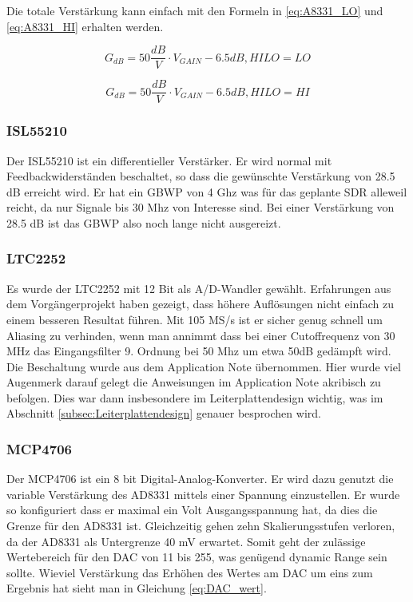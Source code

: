 Die totale Verstärkung kann einfach mit den Formeln\cite{AD8331} in \ref{eq:A8331_LO} und \ref{eq:A8331_HI} erhalten werden.

\begin{equation}
    G_{dB} = 50 \frac{dB}{V} \cdot V_{GAIN} - 6.5 dB, HILO = LO
\label{eq:A8331_LO}
\end{equation}

\begin{equation}
    G_{dB} = 50 \frac{dB}{V} \cdot V_{GAIN} - 6.5 dB, HILO = HI
\label{eq:A8331_HI}
\end{equation}

\subsubsection{ISL55210}
Der ISL55210\cite{ISL55210} ist ein differentieller Verstärker. Er wird normal mit Feedbackwiderständen beschaltet\cite{ImpedanceMatching2009}, so dass die gewünschte Verstärkung von 28.5 dB erreicht wird.
Er hat ein GBWP von 4 Ghz was für das geplante SDR alleweil reicht, da nur Signale bis 30 Mhz von Interesse sind. Bei einer Verstärkung von 28.5 dB ist das GBWP also noch lange nicht ausgereizt.

\subsubsection{LTC2252}
Es wurde der LTC2252\cite{LTC2252} mit 12 Bit als A/D-Wandler gewählt. Erfahrungen aus dem Vorgängerprojekt haben gezeigt, dass höhere Auflösungen nicht einfach zu einem besseren Resultat führen. %
Mit 105 MS/s ist er sicher genug schnell um Aliasing zu verhinden, wenn man annimmt dass bei einer Cutoffrequenz von 30 MHz das Eingangsfilter 9. Ordnung bei 50 Mhz um etwa 50dB gedämpft wird.
Die Beschaltung wurde aus dem Application Note übernommen. Hier wurde viel Augenmerk darauf gelegt die Anweisungen im Application Note akribisch zu befolgen. Dies war dann insbesondere im Leiterplattendesign wichtig, was im Abschnitt \ref{subsec:Leiterplattendesign} genauer besprochen wird.

\subsubsection{MCP4706}
\label{subsec:MCP4706}
Der MCP4706\cite{MCP4706} ist ein 8 bit Digital-Analog-Konverter. Er wird dazu genutzt die variable Verstärkung des AD8331 mittels einer Spannung einzustellen. Er wurde so konfiguriert dass er maximal ein Volt Ausgangsspannung hat, da dies die Grenze für den AD8331 ist. Gleichzeitig gehen zehn Skalierungsstufen verloren, da der AD8331 als Untergrenze 40 mV erwartet. Somit geht der zulässige Wertebereich für den DAC von 11 bis 255, was genügend dynamic Range sein sollte. Wieviel Verstärkung das Erhöhen des Wertes am DAC um eins zum Ergebnis hat sieht man in Gleichung \ref{eq:DAC_wert}.

